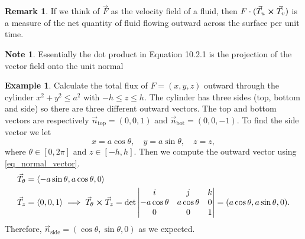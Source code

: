 \documentclass[
	12pt,
	]{article}
\newcommand{\la}{\langle}
\newcommand{\ra}{\rangle}
\theoremstyle{custom}
\theoremstyle{custom}
\theoremstyle{custom}
\theoremstyle{custom}
\theoremstyle{custom}
\theoremstyle{definition}
\newtheorem{example}{Example}[section]
\theoremstyle{example}
\newtheorem*{note}{Note}
\theoremstyle{note}
\newtheorem*{remark}{Remark}
\theoremstyle{remark}
\theoremstyle{example}
\newcounter{theo}[section]\setcounter{theo}{0}
\numberwithin{equation}{subsection}
\begin{document}
				\begin{remark}
					If we think of $\vec{F}$ as the velocity field of a fluid, then $F\cdot (\vec{T}_{u} \cross \vec{T}_{v})$ is a measure of the net quantity of fluid flowing outward across the surface per unit time.
				\end{remark}
				
				\begin{note}
					Essentially the dot product in Equation 10.2.1 is the projection of the vector field onto the unit normal
				\end{note}
				
				\begin{example}
					Calculate the total flux of $F= (x,y,z) $ outward through the cylinder $ x^{2}+y^{2} \le a^{2}$ with $-h \le z \le h$.
					The cylinder has three sides (top, bottom and side) so there are three different outward vectors. The top and bottom vectors are respectively $\vec{n}_{\text{top}} = (0,0,1)$ and $\vec{n}_{\text{bot}} = (0,0,-1)$. To find the side vector we let 
					$$ x = a\cos\theta , \quad y = a\sin\theta ,\quad z=z, $$
					where $\theta \in [0,2\pi]$ and $z\in [-h,h]$. Then we compute the outward vector using \eqref{eq_normal_vector}.
					\begin{align*}
						\vec{T}_{\theta}&= \la -a\sin\theta, a\cos\theta, 0 \ra \\
						\vec{T}_{z} &= \la 0,0,1 \ra \implies \vec{T}_{\theta} \cross \vec{T}_{z} = \det 
						\begin{vmatrix}
							i & j& k \\ -a\cos\theta & a\cos\theta & 0 \\ 0 & 0 & 1
						\end{vmatrix} = (a\cos\theta, a\sin\theta,0).
					\end{align*}
					Therefore, $\vec{n}_{\text{side}} = (\cos\theta, \sin\theta,0)$ as we expected.\\
					

\end{example}
\end{document}
